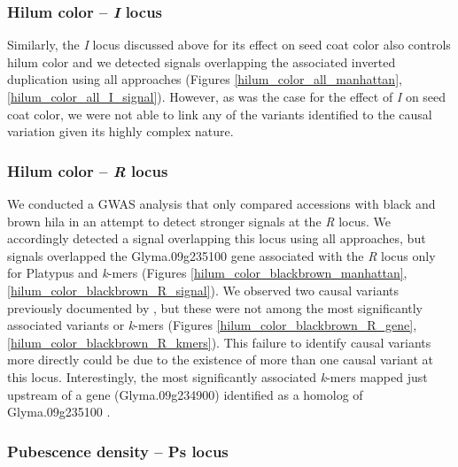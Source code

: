 \subsubsection*{Hilum color -- \textit{I} locus}
\label{sv-gwas-main-results-hilum-color-i}

Similarly, the \textit{I} locus discussed above for its effect on seed coat
color also controls hilum color and we detected signals overlapping the
associated inverted duplication using all approaches (Figures
\ref{hilum_color_all_manhattan}, \ref{hilum_color_all_I_signal}). However,
as was the case for the effect of \textit{I} on seed coat color, we were
not able to link any of the variants identified to the causal variation given
its highly complex nature.

\subsubsection*{Hilum color -- \textit{R} locus}
\label{sv-gwas-main-results-hilum-color-r}

We conducted a GWAS analysis that only compared accessions with black and brown hila
in an attempt to detect stronger signals at the \textit{R} locus.  We
accordingly detected a signal overlapping this locus using all approaches,
but signals overlapped the Glyma.09g235100 gene associated with the
\textit{R} locus only for Platypus and \textit{k}-mers (Figures
\ref{hilum_color_blackbrown_manhattan}, \ref{hilum_color_blackbrown_R_signal}).
We observed two causal variants previously documented by \cite{gillman2011},
but these were not among the most significantly associated variants or
\textit{k}-mers (Figures \ref{hilum_color_blackbrown_R_gene},
\ref{hilum_color_blackbrown_R_kmers}).  This failure to identify causal
variants more directly could be due to the existence of more than one causal
variant at this locus. Interestingly, the most significantly associated
\textit{k}-mers mapped just upstream of a gene (Glyma.09g234900) identified as
a homolog of Glyma.09g235100 \citep{gillman2011}.

\subsubsection*{Pubescence density -- Ps locus}
\label{sv-gwas-main-results-pubescence-density-ps}

